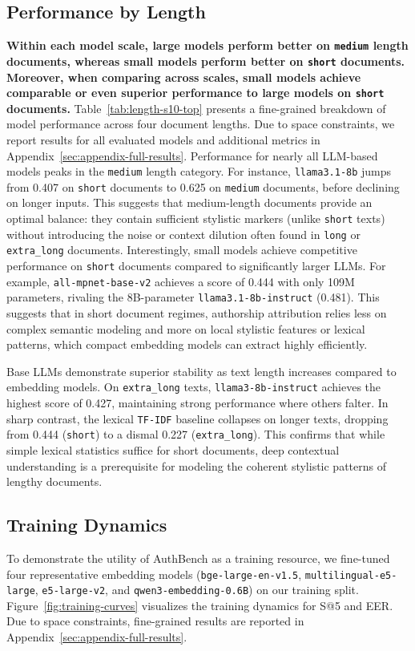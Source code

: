 \documentclass[11pt]{article}
\begin{document}
\subsection{Performance by Length}
\textbf{Within each model scale, large models perform better on \texttt{medium} length documents, whereas small models perform better on \texttt{short} documents. Moreover, when comparing across scales, small models achieve comparable or even superior performance to large models on \texttt{short} documents.} Table~\ref{tab:length-s10-top} presents a fine-grained breakdown of model performance across four document lengths. Due to space constraints, we report results for all evaluated models and additional metrics in Appendix~\ref{sec:appendix-full-results}.
Performance for nearly all LLM-based models peaks in the \texttt{medium} length category. 
For instance, \texttt{llama3.1-8b} jumps from 0.407 on \texttt{short} documents to 0.625 on \texttt{medium} documents, before declining on longer inputs. This suggests that medium-length documents provide an optimal balance: they contain sufficient stylistic markers (unlike \texttt{short} texts) without introducing the noise or context dilution often found in \texttt{long} or \texttt{extra\_long} documents. Interestingly, small models achieve competitive performance on \texttt{short} documents compared to significantly larger LLMs. For example, \texttt{all-mpnet-base-v2} achieves a score of 0.444 with only 109M parameters, rivaling the 8B-parameter \texttt{llama3.1-8b-instruct} (0.481). This suggests that in short document regimes, authorship attribution relies less on complex semantic modeling and more on local stylistic features or lexical patterns, which compact embedding models can extract highly efficiently.


Base LLMs demonstrate superior stability as text length increases compared to embedding models. On \texttt{extra\_long} texts, \texttt{llama3-8b-instruct} achieves the highest score of 0.427, maintaining strong performance where others falter. In sharp contrast, the lexical \texttt{TF-IDF} baseline collapses on longer texts, dropping from 0.444 (\texttt{short}) to a dismal 0.227 (\texttt{extra\_long}). This confirms that while simple lexical statistics suffice for short documents, deep contextual understanding is a prerequisite for modeling the coherent stylistic patterns of lengthy documents. 


\subsection{Training Dynamics}
\label{sec:dynamics}
To demonstrate the utility of AuthBench as a training resource, we fine-tuned four representative embedding models (\texttt{bge-large-en-v1.5}, \texttt{multilingual-e5-large}, \texttt{e5-large-v2}, and \texttt{qwen3-embedding-0.6B}) on our training split. Figure~\ref{fig:training-curves} visualizes the training dynamics for S@5 and EER. Due to space constraints, fine-grained results are reported in Appendix~\ref{sec:appendix-full-results}.
\end{document}
